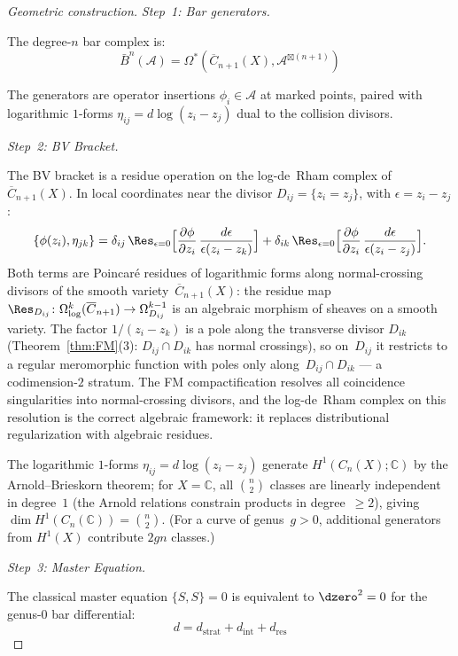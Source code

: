 \begin{proof}[Geometric construction]
\emph{Step~1: Bar generators.}

The degree-$n$ bar complex is:
\[\bar{B}^n(\mathcal{A}) = \Omega^*(\overline{C}_{n+1}(X), \mathcal{A}^{\boxtimes (n+1)})\]

The generators are operator insertions $\phi_i \in \mathcal{A}$ at marked points, paired with logarithmic $1$-forms $\eta_{ij} = d\log(z_i - z_j)$ dual to the collision divisors.

\emph{Step~2: BV Bracket.}

The BV bracket is a residue operation on the log-de~Rham complex
of~$\overline{C}_{n+1}(X)$.  In local coordinates near the divisor
$D_{ij} = \{z_i = z_j\}$, with $\epsilon = z_i - z_j$:
\[\{\phi(z_i), \eta_{jk}\}
= \delta_{ij}\,\Res_{\epsilon = 0}
\Bigl[\frac{\partial\phi}{\partial z_i}\,
\frac{d\epsilon}{\epsilon(z_i - z_k)}\Bigr]
+ \delta_{ik}\,\Res_{\epsilon = 0}
\Bigl[\frac{\partial\phi}{\partial z_i}\,
\frac{d\epsilon}{\epsilon(z_i - z_j)}\Bigr].\]
Both terms are Poincar\'e residues of logarithmic forms along
normal-crossing divisors of the smooth
variety~$\overline{C}_{n+1}(X)$: the residue map
$\Res_{D_{ij}}\colon \Omega^k_{\log}(\overline{C}_{n+1})
\to \Omega^{k-1}_{D_{ij}}$ is an algebraic morphism of sheaves
on a smooth variety.  The factor $1/(z_i - z_k)$ is a pole along
the transverse divisor $D_{ik}$ (Theorem~\ref{thm:FM}(3):
$D_{ij} \cap D_{ik}$ has normal crossings), so on~$D_{ij}$
it restricts to a regular meromorphic function with poles only
along~$D_{ij} \cap D_{ik}$ --- a codimension-$2$ stratum.
The FM compactification resolves all coincidence singularities
into normal-crossing divisors, and the log-de~Rham complex on
this resolution is the correct algebraic framework: it replaces
distributional regularization with algebraic residues.

The logarithmic $1$-forms $\eta_{ij} = d\log(z_i - z_j)$ generate
$H^1(C_n(X); \mathbb{C})$ by the Arnold--Brieskorn theorem;
for $X = \mathbb{C}$, all $\binom{n}{2}$ classes are linearly independent in degree~$1$
(the Arnold relations constrain products in degree~$\geq 2$), giving
$\dim H^1(C_n(\mathbb{C})) = \binom{n}{2}$.  (For a curve of genus~$g > 0$, additional generators from $H^1(X)$ contribute $2gn$ classes.)

\emph{Step~3: Master Equation.}

The classical master equation $\{S, S\} = 0$ is equivalent to $\dzero^2 = 0$ for the
genus-$0$ bar differential:
\[d = d_{\text{strat}} + d_{\text{int}} + d_{\text{res}}\]
\end{proof}


